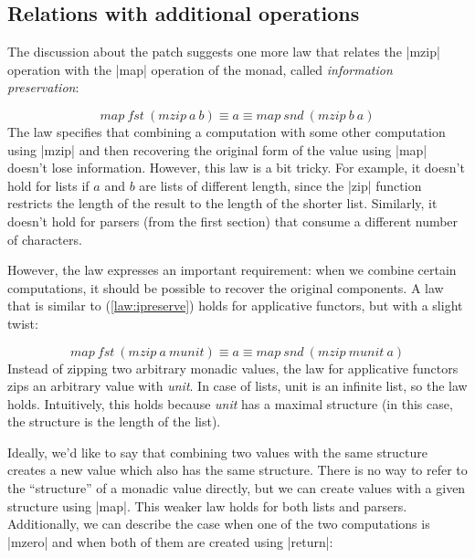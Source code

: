 \documentclass{tmr}
\newcommand{\map}[2]{\mathit{map}\ #1\ #2}
\newcommand{\mzip}[2]{\mathit{mzip}\ #1\ #2}
\newcommand{\fst}{\mathit{fst}}
\newcommand{\snd}{\mathit{snd}}
\begin{document}

\subsection{Relations with additional operations}

The discussion about the patch \cite{bringbackmc} suggests one more law that relates the |mzip|
operation with the |map| operation of the monad, called \textit{information preservation}:

\begin{equation}
  \map \fst {(\mzip a b)} \equiv a \equiv \map \snd {(\mzip b a)}
  \label{law:ipreserve}
\end{equation}
The law specifies that combining a computation with some other computation using |mzip| and then 
recovering the original form of the value using |map| doesn't lose
information. However, this law is a bit 
tricky. For example, it doesn't hold for lists if $a$ and $b$ are
lists of different length, since 
the |zip| function restricts the length of the result to the length of the shorter list. Similarly, it 
doesn't hold for parsers (from the first section) that consume a different number of characters. 

However, the law expresses an important requirement: when we combine certain computations, it should be
possible to recover the original components. A law that is similar to (\ref{law:ipreserve}) holds for 
applicative functors, but with a slight twist:

\begin{equation}
  \map \fst {(\mzip a {munit})} \equiv a \equiv \map \snd {(\mzip {munit} a)}
  \label{law:ipreserve-applicative}
\end{equation}
Instead of zipping two arbitrary monadic values, the law for applicative functors zips an arbitrary 
value with \textit{unit}. In case of lists, unit is an infinite list, so the law holds. Intuitively,
this holds because \textit{unit} has a maximal structure (in this case, the structure is the length 
of the list).

Ideally, we'd like to say that combining two values with the same structure creates a new value
which also has the same structure. There is no way to refer to the
``structure'' of a monadic value directly, 
but we can create values with a given structure using |map|. This weaker law holds for both lists and 
parsers. Additionally, we can describe the case when one of the two computations is |mzero| and
when both of them are created using |return|:
\end{document}
